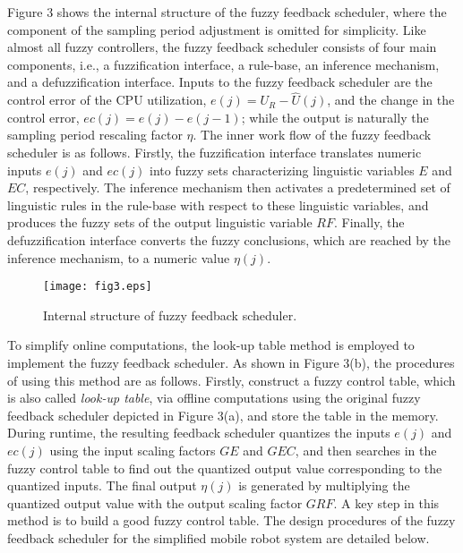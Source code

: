 \documentclass[12pt,a4paper]{ijicic}
\begin{document}
Figure 3 shows the internal structure of the fuzzy
feedback scheduler, where the component of the sampling period
adjustment is omitted for simplicity. Like almost all fuzzy
controllers, the fuzzy feedback scheduler consists of four main
components, i.e., a fuzzification interface, a rule-base, an
inference mechanism, and a defuzzification interface. Inputs to the
fuzzy feedback scheduler are the control error of the CPU utilization,
$e(j) = U_R-\hat{U}(j)$, and the change in the control error, $ec(j) =
e(j)-e(j-1)$; while the output is naturally the sampling period
rescaling factor $\eta$. The inner work flow of the fuzzy feedback
scheduler is as follows. Firstly, the fuzzification interface
translates numeric inputs $e(j)$ and $ec(j)$ into fuzzy sets
characterizing linguistic variables $E$ and $EC$, respectively. The
inference mechanism then activates a predetermined set of linguistic
rules in the rule-base with respect to these linguistic variables,
and produces the fuzzy sets of the output linguistic variable $RF$.
Finally, the defuzzification interface converts the fuzzy
conclusions, which are reached by the inference mechanism, to a
numeric value $\eta(j)$.
\begin{figure}[htb!]
\begin{center}
\texttt{[image: fig3.eps]}
\caption{Internal structure of fuzzy feedback scheduler.}
\label{fig3}
\end{center}
\end{figure}

To simplify online computations, the look-up table method is
employed to implement the fuzzy feedback scheduler. As shown in
Figure 3(b), the procedures of using this method are as follows.
Firstly, construct a fuzzy control table, which is also called \emph{look-up
table}, via offline computations using the original fuzzy feedback
scheduler depicted in Figure 3(a), and store the table in the
memory. During runtime, the resulting feedback scheduler quantizes
the inputs $e(j)$ and $ec(j)$ using the input scaling factors $GE$
and $GEC$, and then searches in the fuzzy control table to find out
the quantized output value corresponding to the quantized inputs.
The final output $\eta(j)$ is generated by multiplying the quantized
output value with the output scaling factor $GRF$. A key step in
this method is to build a good fuzzy control table. The design
procedures of the fuzzy feedback scheduler for the simplified mobile
robot system are detailed below.
\end{document}
